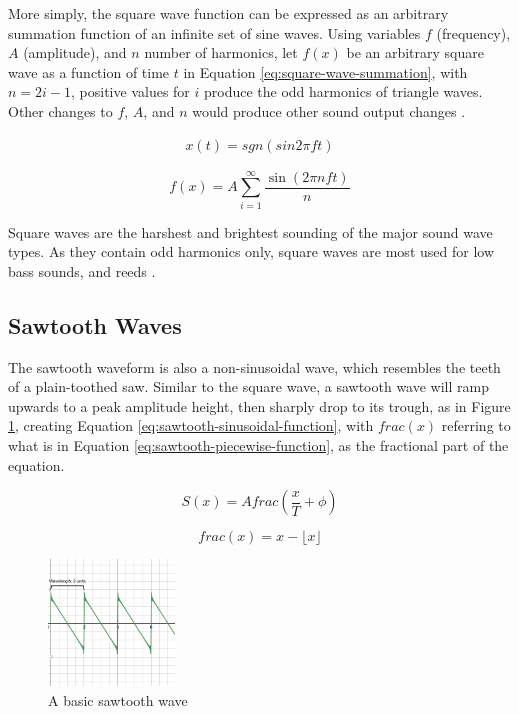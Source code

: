 More simply, the square wave function can be expressed as an arbitrary summation function of an infinite set of sine waves. Using variables $f$ (frequency), $A$ (amplitude), and $n$ number of harmonics, let $f(x)$ be an arbitrary square wave as a function of time $t$ in Equation \ref{eq:square-wave-summation}, with $n = 2i - 1$, positive values for $i$ produce the odd harmonics of triangle waves. Other changes to $f$, $A$, and $n$ would produce other sound output changes \cite{Wellesley_College_Staff_2021}.

\begin{align}
	x(t) = sgn(sin2\pi ft)
	\label{eq:square-wave-function}
\end{align} 

\begin{equation}
	f(x) = A\sum_{i=1}^{\infty}\frac{\sin(2\pi nft)}{n}
	\label{eq:square-wave-summation}
\end{equation}

Square waves are the harshest and brightest sounding of the major sound wave types. As they contain odd harmonics only, square waves are most used for low bass sounds, and reeds \cite{Dowsett_2016}. 

\subsection{Sawtooth Waves}
The sawtooth waveform is also a non-sinusoidal wave, which resembles the teeth of a plain-toothed saw. Similar to the square wave, a sawtooth wave will ramp upwards to a peak amplitude height, then sharply drop to its trough, as in Figure \ref{fig:basic-sawtooth-wave}, creating Equation \ref{eq:sawtooth-sinusoidal-function}, with $frac(x)$ referring to what is in Equation \ref{eq:sawtooth-piecewise-function}, as the fractional part of the equation. 

\begin{equation}
	S(x) = Afrac(\frac{x}{T} + \phi)
	\label{eq:sawtooth-sinusoidal-function}
\end{equation}

\begin{equation}
	frac(x) = x - \lfloor x \rfloor
	\label{eq:sawtooth-piecewise-function}
\end{equation}

\begin{figure}[ht]
  \centering
  \includegraphics[width=0.3\textwidth]{figures/sawtooth-wave.png}
  \caption{A basic sawtooth wave}
  \label{fig:basic-sawtooth-wave}
\end{figure}


